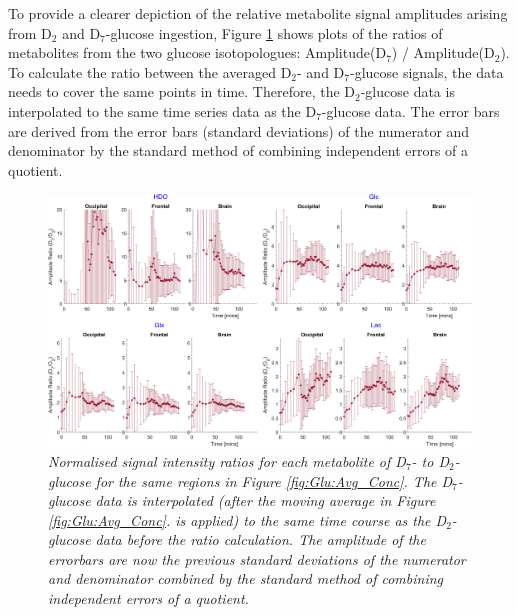 To provide a clearer depiction of the relative metabolite signal amplitudes arising from D$_2$ and D$_7$-glucose ingestion, Figure \ref{fig:Glu:D7_D2} shows plots of the ratios of metabolites from the two glucose isotopologues: Amplitude(D$_7$) / Amplitude(D$_2$). To calculate the ratio between the averaged D$_2$- and D$_7$-glucose signals, the data needs to cover the same points in time. Therefore, the D$_2$-glucose data is interpolated to the same time series data as the D$_7$-glucose data. The error bars are derived from the error bars (standard deviations) of the numerator and denominator by the standard method of combining independent errors of a quotient. 

\begin{figure}
    \centering
    \includegraphics[width = 1\textwidth]{Figures/Glucose/D7_D2.png}
    \caption{\textit{Normalised signal intensity ratios for each metabolite of D$_7$- to D$_2$-glucose for the same regions in Figure \ref{fig:Glu:Avg_Conc}. The D$_7$-glucose data is interpolated (after the moving average in Figure \ref{fig:Glu:Avg_Conc}. is applied) to the same time course as the D$_2$-glucose data before the ratio calculation. The amplitude of the errorbars are now the previous standard deviations of the numerator and denominator combined by the standard method of combining independent errors of a quotient.}}
    \label{fig:Glu:D7_D2}
\end{figure}

